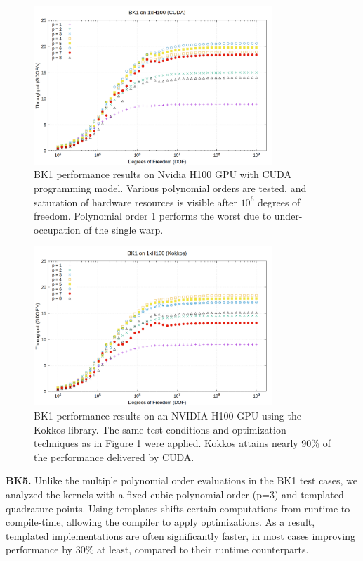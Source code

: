 \documentclass[a4paper,12pt]{article}
\begin{document}
\begin{figure}
\centering
\includegraphics[width=0.8\textwidth]{BK1_1}
\caption{BK1 performance results on Nvidia H100 GPU with CUDA programming model. Various polynomial orders are tested, and saturation of hardware resources is visible after $10^6$ degrees of freedom. Polynomial order 1 performs the worst due to under-occupation of the single warp.}\label{fig:BK1_1}
\end{figure}
\begin{figure}
\centering
\includegraphics[width=0.8\textwidth]{BK1_2}
\caption{BK1 performance results on an NVIDIA H100 GPU using the Kokkos library. The same test conditions and optimization techniques as in Figure 1 were applied. Kokkos attains nearly 90\% of the performance delivered by CUDA.}
\label{fig:BK1_2}
\end{figure}

{\bf BK5.} Unlike the multiple polynomial order evaluations in the BK1 test cases, we analyzed the kernels with a fixed cubic polynomial order (p=3) and templated quadrature points. Using templates shifts certain computations from runtime to compile-time, allowing the compiler to apply optimizations. As a result, templated implementations are often significantly faster, in most cases improving performance by 30\% at least, compared to their runtime counterparts.
\end{document}
